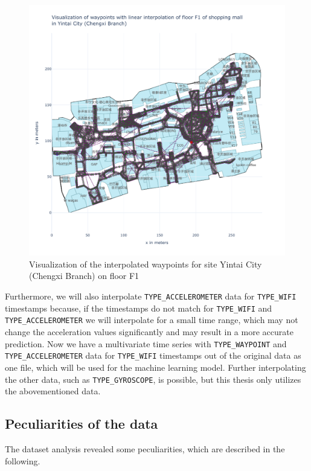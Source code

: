 \begin{figure}[h!]
    \centering
    \includegraphics[scale=0.375]{images/whole_floor_visualization_interpolated.pdf}
    \caption{Visualization of the interpolated waypoints for site Yintai City (Chengxi Branch) on floor F1}
    \label{fig:vis-interpolated}
\end{figure}

Furthermore, we will also interpolate \texttt{TYPE\_ACCELEROMETER} data for \texttt{TYPE\_WIFI} timestamps because, if the timestamps do not match for \texttt{TYPE\_WIFI} and \texttt{TYPE\_ACCELEROMETER} we will interpolate for a small time range, which may not change the acceleration values significantly and may result in a more accurate prediction.
Now we have a multivariate time series with \texttt{TYPE\_WAYPOINT} and \texttt{TYPE\_ACCELEROMETER} data for \texttt{TYPE\_WIFI} timestamps out of the original data as one file, which will be used for the machine learning model.
Further interpolating the other data, such as \texttt{TYPE\_GYROSCOPE}, is possible, but this thesis only utilizes the abovementioned data.


\subsection{Peculiarities of the data}\label{sec:special-cases}
The dataset analysis revealed some peculiarities, which are described in the following.

